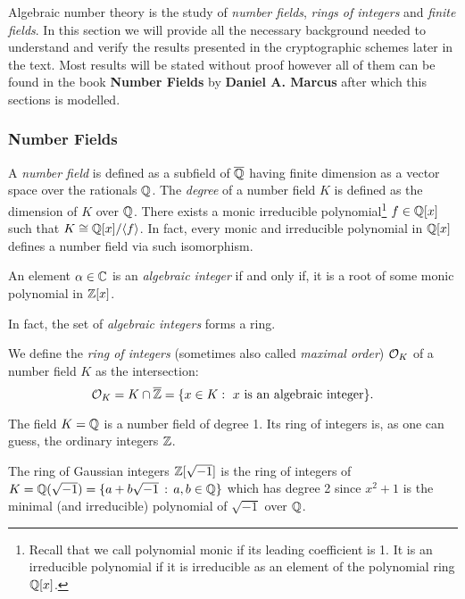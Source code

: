 Algebraic number theory is the study of \textit{number fields}, \textit{rings of integers} and \textit{finite fields}. In this section we will provide all the necessary background needed to understand and verify the results presented in the cryptographic schemes later in the text. Most results will be stated without proof however all of them can be found in the book \textbf{Number Fields} by \textbf{Daniel A. Marcus} \cite{algebra} after which this sections is modelled.

\subsubsection*{Number Fields}
A \textit{number field} is defined as a subfield of $\overline{\mathbb{Q}}$ having finite dimension as a vector space over the rationals $\mathbb{Q}$. The \textit{degree} of a number field $K$ is defined as the dimension of $K$ over $\mathbb{Q}$. There exists a monic irreducible polynomial\footnote{Recall that we call polynomial monic if its leading coefficient is 1. It is an irreducible polynomial if it is irreducible as an element of the polynomial ring $\mathbb{Q}[x]$.} $f \in \mathbb{Q}[x]$ such that $K \cong \mathbb{Q}[x]/\langle f \rangle$. In fact, every monic and irreducible polynomial in $\mathbb{Q}[x]$ defines a number field via such isomorphism.

\begin{definition}
    An element $\alpha \in \mathbb{C}$ is an \textit{algebraic integer} if and only if, it is a root of some monic polynomial in $\mathbb{Z}[x]$.
\end{definition}
In fact, the set of \textit{algebraic integers} forms a ring.

\begin{definition}
We define the \textit{ring of integers} (sometimes also called \textit{maximal order}) $\mathcal{O}_K$ of a number field $K$ as the intersection:
$$
  \mathcal{O}_K = K \cap \overline{\mathbb{Z}} = \{x \in K : \text{ $x$ is an algebraic integer}\}.
$$
\end{definition}

\begin{example}
    The field $K = \mathbb{Q}$ is a number field of degree 1. Its ring of integers is, as one can guess, the ordinary integers $\mathbb{Z}$.
\end{example}

\begin{example}
    The ring of Gaussian integers $\mathbb{Z}[\sqrt{-1}]$ is the ring of integers of $K = \mathbb{Q}(\sqrt{-1}) = \{a + b\sqrt{-1}\, :\, a,b\in \mathbb{Q}\}$ which has degree 2 since $x^2+1$ is the minimal (and irreducible) polynomial of $\sqrt{-1}$ over $\mathbb{Q}$.
\end{example}

